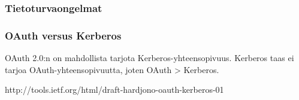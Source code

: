 \subsubsection{Tietoturvaongelmat}

\subsubsection{OAuth versus Kerberos}

OAuth 2.0:n on mahdollista tarjota Kerberos-yhteensopivuus. Kerberos taas ei tarjoa OAuth-yhteensopivuutta, joten OAuth > Kerberos.

http://tools.ietf.org/html/draft-hardjono-oauth-kerberos-01
